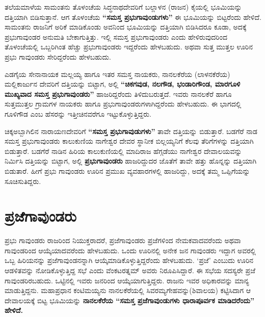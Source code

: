 ತಲೆಯಮಾಳೆಯ ಸಾಮಂತನು ತೊಳಂಚೆಯ ಸಿದ್ಧನಾಥದೇವರಿಗೆ ಬಲ್ಲಾಳನ (ರಾಜನ) ಕೈಯಲ್ಲಿ ಭೂಮಿಯನ್ನು ದತ್ತಿಯಾಗಿ ಬಿಡಿಸುತ್ತಾನೆ. ಆಗ ತೊಳಂಚೆಯ \textbf{“ಸಮಸ್ತ ಪ್ರಭುಗಾವುಂಡುಗಳು”} ಈ ಭೂಮಿಯನ್ನು ಬಿಟ್ಟರೆಂದು ಹೇಳಿದೆ. ಸಾಮಂತನು ರಾಜನಿಗೆ ಅರಿಕೆ ಮಾಡಿಕೊಂಡು ಅವನಿಂದ ಭೂಮಿಯನ್ನು ದತ್ತಿಯಾಗಿ ಬಿಡಿಸಿದರೂ ಕೂಡಾ, ಅದಕ್ಕೆ ಪ್ರಭುಗಾವುಂಡರ ಅನುಮತಿ ಬೇಕಾಗುತ್ತಿತ್ತು. ಇಲ್ಲಿ ಸಮಸ್ತ ಪ್ರಭುಗಾವುಂಡರು ಎಂದು ಹೇಳಿರುವುದರಿಂದ ತೊಳಂಚೆಯಲ್ಲಿ ಒಬ್ಬರಿಗಿಂತ ಹೆಚ್ಚು ಪ್ರಭುಗಾವುಂಡರು ಇದ್ದರೆಂದು ಹೇಳಬಹುದು. ಅಥವಾ ಸುತ್ತ ಮುತ್ತಲ ಊರಿನ ಪ್ರಭು ಗಾವುಂಡರು ಸೇರಿದ್ದರೆಂದು ಹೇಳಬಹುದು.

ಎಡಗೈಯ ಸೇನಾನಾಯಕ ಮಲ್ಲಯ್ಯ ಹಾಗೂ ಇತರ ಸಮಸ್ತ ನಾಯಕರು, ನಾನಲಕೆರೆಯ (ಲಾಳನಕೆರೆಯ) ಮಲ್ಲಿಕಾರ್ಜುನ ದೇವರಿಗೆ ದತ್ತಿಯನ್ನು ಬಿಟ್ಟಾಗ, ಅಲ್ಲಿ \textbf{“ಚಿಕಗವುಡ, ನಲಗೌಡ, ಭಂಡಾರಿಗೌಂಡ, ಮಾರಗೂಳಿ ಮುಖ್ಯವಾದ ಸಮಸ್ತ ಪ್ರಭುಗಾವುಂಡರು” }ಹಾಜರಿದ್ದರೆಂದು ತಿಳಿದುಬರುತ್ತದೆ. ಇವರು ನಾನಲಕೆರೆ ಹಾಗೂ ಸುತ್ತಮುತ್ತಲ ಗ್ರಾಮಗಳ ನಾಯಕರು ಹಾಗೂ ಪ್ರಭುಗಾವುಂಡರುಗಳಾಗಿದ್ದರೆಂದು ಹೇಳಬಹುದು. ಈ ಭಾಗದಲ್ಲಿ ಗೂಳಿಗೌಡ ಎಂಬ ಹೆಸರನ್ನು ಇತ್ತೀಚಿನವರೆಗೂ ಇಟ್ಟುಕೊಳ್ಳುತ್ತಿದ್ದರು.

ಚಿಕ್ಕಅಬ್ಬಾಗಿಲಿನ ನಾರಾಯಣದೇವರಿಗೆ \textbf{“ಸಮಸ್ತ ಪ್ರಭುಗಾವುಡುಗಳು”} ತಾವೇ ದತ್ತಿಯನ್ನು ಬಿಡುತ್ತಾರೆ. ಬಡಗೆರೆ ನಾಡ ಸಮಸ್ತ ಪ್ರಭುಗಾವುಂಡರು ಕಾಲುಕುಣಿಯ ನಾಗೇಶ್ವರ ದೇವರ ಸ್ಥಾನೀಕ ಬಿಲ್ಲಯ್ಯನಿಗೆ ಕೆಲವು ತೆರಿಗೆಗಳನ್ನು ದತ್ತಿಯಾಗಿ ಬಿಡುತ್ತಾರೆ. ಬಡಗೆರೆ ನಾಡಿನ ಹಿರಿಯ ಕಾಲುಕುಣಿಯಲ್ಲಿ ಮಾದಿರಾಜ ಹೆಗ್ಗಡೆಯು ನಾಗೇಶ್ವರ ದೇವಾಲಯವನ್ನು ನಿರ್ಮಿಸಿ ದತ್ತಿಯನ್ನು ಬಿಟ್ಟಾಗ, ಅಲ್ಲಿ \textbf{ಪ್ರಭುಗಾವುಂಡರು} ಹಾಜರಿದ್ದುದರ ಜೊತೆಗೆ ತಾವೇ ಹತ್ತು ಹೊನ್ನನ್ನು ದತ್ತಿಯಾಗಿ ಬಿಡುತಾರೆ. ಹೀಗೆ ಪ್ರಭು ಗಾವುಂಡರು ಊರಿನ ಪ್ರಮುಖ ವ್ಯವಹಾರಗಳಲ್ಲಿ ಹಾಜರಿದ್ದು, ಅದಕ್ಕೆ ತಮ್ಮ ಒಪ್ಪಿಗೆಯನ್ನು ಸೂಚಿಸುತಿದ್ದರು.


\section{ಪ್ರಜೆಗಾವುಂಡರು}

ಪ್ರಭು ಗಾವುಂಡರು ರಾಜರಿಂದ ನಿಯುಕ್ತರಾದರೆ, ಪ್ರಜೆಗಾವುಂಡರು ಪ್ರಜೆಗಳಿಂದ ನೇಮಕವಾದವರೆಂದು ಅಥವಾ ಗಾವುಂಡ\-ರಿಂದ ಆಯ್ಕೆಯಾದವರೆಂದು ಹೇಳಬಹುದು. ಒಂದು ಊರಿನಲ್ಲಿ ಅನೇಕ ಜನ ಗಾವುಂಡರು ಇದ್ದಾಗ ಅವರಲ್ಲಿ ಒಬ್ಬ ಹಿರಿಯನನ್ನು ಪ್ರಜೆಗಾವುಂಡನನ್ನಾಗಿ ಆಯ್ಕೆಮಾಡಿಕೊಳ್ಳುತ್ತಿದ್ದರೆಂದು ಹೇಳಬಹುದು. ‘ಪ್ರಜೆ’ ಎಂಬುದು ಊರಿನ ಆಡಳಿತವನ್ನು ನೋಡಿ\-ಕೊಳ್ಳುತ್ತಿದ್ದ ಸಭೆ ಎಂದು ವೆಂಕಟರತ್ನಮ್ ಅವರು ನಿರೂಪಿಸಿದ್ದಾರೆ. ಈ ಸಭೆಯ ಸದಸ್ಯರೇ ಪ್ರಜೆ ಗಾವುಂಡರಿರಬಹುದು. ಒಟ್ಟಿನಲ್ಲಿ ಇವರು ಜನರಿಂದ ಆಯ್ಕೆಯಾಗುತ್ತಿದ್ದರು. ರಾಜನು ಇವರ ಅಧಿಕಾರವನ್ನು ಮಾನ್ಯ ಮಾಡುತ್ತಿದ್ದನು. ಮಹಾಪ್ರಧಾನ ಕಂಟಿಮಯ್ಯನು ನಾನಲಕೆರೆಯಲ್ಲಿ ಸಿವರಮ್ಯಗೇಹವನ್ನು(ಶಿವಾಲಯ) ಕಟ್ಟಿಸಿದಾಗ ಆ ದೇವಾಲಯಕ್ಕೆ ಬಿಟ್ಟ ಭೂಮಿಯನ್ನು \textbf{ನಾನಲಕೆರೆಯ “ಸಮಸ್ತ ಪ್ರಜೆಗಾವುಂಡುಗಳು ಧಾರಾಪೂರ್ವಕ ಮಾಡಿದರೆಂದು” ಹೇಳಿದೆ.}

